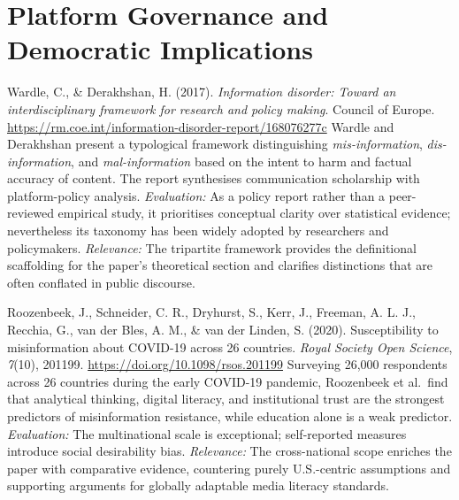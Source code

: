 \section{Platform Governance and Democratic Implications}

\bibentry
  {Wardle, C., \& Derakhshan, H. (2017). \textit{Information disorder: Toward an interdisciplinary
   framework for research and policy making}. Council of Europe.
   \href{https://rm.coe.int/information-disorder-report/168076277c}{https://rm.coe.int/information-disorder-report/168076277c}}
  {Wardle and Derakhshan present a typological framework distinguishing \textit{mis-information},
   \textit{dis-information}, and \textit{mal-information} based on the intent to harm and
   factual accuracy of content. The report synthesises communication scholarship with platform-policy
   analysis. \textit{Evaluation:} As a policy report rather than a peer-reviewed empirical study,
   it prioritises conceptual clarity over statistical evidence; nevertheless its taxonomy has been
   widely adopted by researchers and policymakers. \textit{Relevance:} The tripartite framework
   provides the definitional scaffolding for the paper's theoretical section and clarifies
   distinctions that are often conflated in public discourse.}

\bibentry
  {Roozenbeek, J., Schneider, C. R., Dryhurst, S., Kerr, J., Freeman, A. L. J., Recchia, G.,
   van der Bles, A. M., \& van der Linden, S. (2020). Susceptibility to misinformation about
   COVID-19 across 26 countries. \textit{Royal Society Open Science}, \textit{7}(10), 201199.
   \href{https://doi.org/10.1098/rsos.201199}{https://doi.org/10.1098/rsos.201199}}
  {Surveying 26,000 respondents across 26 countries during the early COVID-19 pandemic,
   Roozenbeek et al.\ find that analytical thinking, digital literacy, and institutional trust
   are the strongest predictors of misinformation resistance, while education alone is a weak
   predictor. \textit{Evaluation:} The multinational scale is exceptional; self-reported measures
   introduce social desirability bias. \textit{Relevance:} The cross-national scope enriches the
   paper with comparative evidence, countering purely U.S.-centric assumptions and supporting
   arguments for globally adaptable media literacy standards.}
